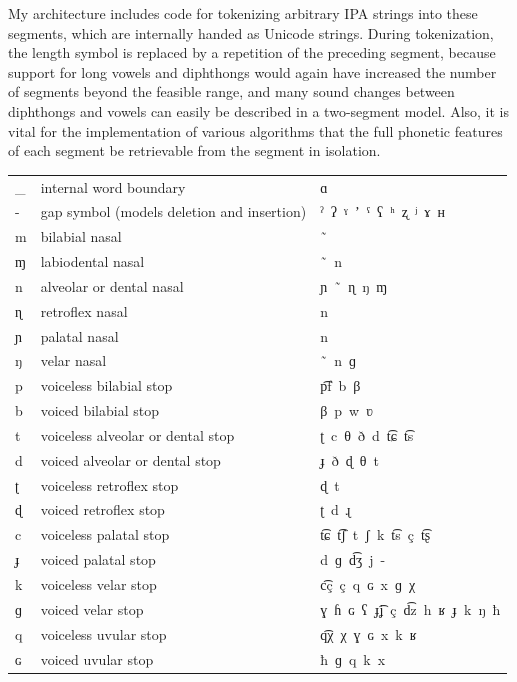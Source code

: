 My architecture includes code for tokenizing arbitrary IPA strings into these segments, which are internally handed as Unicode strings. During tokenization, the length symbol is replaced by a repetition of the preceding segment, because support for long vowels and diphthongs would again have increased the number of segments beyond the feasible range, and many sound changes between diphthongs and vowels can easily be described in a two-segment model. Also, it is vital for the implementation of various algorithms that the full phonetic features of each segment be retrievable from the segment in isolation.

\newpage \footnotesize
\begin{center}
\begin{tabular}{lll}
\hline
\_ & internal word boundary & ɑ\\
- & gap symbol (models deletion and insertion) & ˀ\ ʔ\ ˠ\ ʼ\ ˤ\ ʕ\ \color{gray}ʰ\ ʐ\ ʲ\ ɤ\ ʜ\\
m & bilabial nasal & \ ̃\\
ɱ & labiodental nasal & \ ̃\ \color{gray}n\\
n & alveolar or dental nasal & ɲ\ \ ̃\ ɳ\ ŋ\ ɱ\\
ɳ & retroflex nasal & n\\
ɲ & palatal nasal & n\\
ŋ & velar nasal & \ ̃\ \color{gray}n\ ɡ\\
p & voiceless bilabial stop & p͡f\ \color{gray}b\ β\\
b & voiced bilabial stop & β\ \color{gray}p\ w\ ʋ\\
t & voiceless alveolar or dental stop & ʈ\ c\ θ\ ð\ \color{gray}d\ t͡ɕ\ t͡s\\
d & voiced alveolar or dental stop & ɟ\ ð\ ɖ\ θ\ \color{gray}t\\
ʈ & voiceless retroflex stop & ɖ\ t\\
ɖ & voiced retroflex stop & ʈ\ d\ \color{gray}ɻ\\
c & voiceless palatal stop & t͡ɕ\ t͡ʃ\ t\ ʃ\ \color{gray}k\ t͡s\ ç\ t͡ʂ\\
ɟ & voiced palatal stop & d\ \color{gray}ɡ\ d͡ʒ\ j\ -\\
k & voiceless velar stop & c͡ç\ ç\ q\ ɢ\ \color{gray}x\ ɡ\ χ\\
ɡ & voiced velar stop & ɣ\ ɦ\ ɢ\ ʕ\ ɟ͡ʝ\ ç\ d͡z\ h\ \color{gray}ʁ\ ɟ\ k\ ŋ\ ħ\\
q & voiceless uvular stop & q͡χ\ χ\ ɣ\ ɢ\ x\ k\ ʁ\\
ɢ & voiced uvular stop & ħ\ ɡ\ q\ k\ x\\

\end{tabular}
\end{center}
